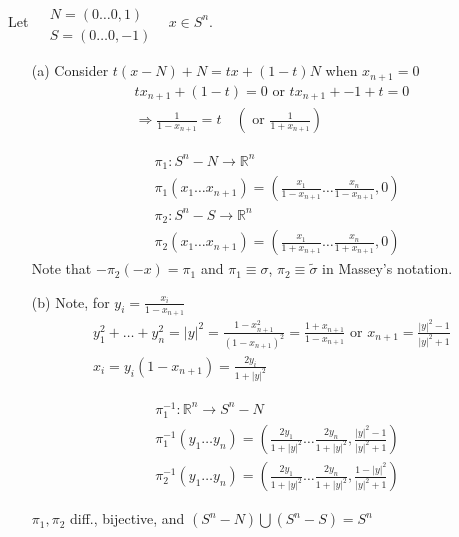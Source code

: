 Let $\begin{aligned} & \quad \\
  & N = (0 \dots 0, 1) \\ 
  & S = (0 \dots 0, -1) \end{aligned}$ \quad \, $x\in S^n$. 
\begin{enumerate}
\item[(a)]
 Consider $t(x-N) + N = tx + (1-t)N$ when $x_{n+1} =0$ 
\[
\begin{gathered}
  tx_{n+1} + (1-t) = 0 \text{ or } tx_{n+1} + -1 + t = 0 \\ 
  \Longrightarrow \frac{ 1}{ 1- x_{n+1} } = t \quad \left( \text{ or } \frac{1}{ 1 + x_{n+1} } \right)
\end{gathered}
\]

\[
\begin{aligned}
  & \pi_1: S^n - N \to \mathbb{R}^n \\ 
  & \pi_1(x_1 \dots x_{n+1}) = \left( \frac{x_1}{ 1 - x_{n+1} } \dots \frac{x_n}{ 1 - x_{n+1} } , 0 \right) \\ 
  & \pi_2 : S^n -S \to \mathbb{R}^n \\ 
  & \pi_2(x_1 \dots x_{n+1}) = \left( \frac{x_1}{ 1 + x_{n+1}} \dots \frac{x_n}{ 1 + x_{n+1} }, 0 \right)
\end{aligned}
\]
Note that $-\pi_2(-x) = \pi_1$ and $\pi_1 \equiv \sigma$, $\pi_2 \equiv \widetilde{\sigma}$ in Massey's notation.  
\item[(b)] Note, for $y_i = \frac{x_i}{ 1 - x_{n+1}}$
\[
\begin{gathered}
  y_1^2 + \dots +y_n^2 = |y|^2 = \frac{1-  x_{n+1}^2}{ (1-x_{n+1})^2 } = \frac{1+ x_{n+1}}{ 1- x_{n+1}} \text{ or } x_{n+1}  = \frac{ |y|^2 - 1 }{ |y|^2 + 1 }  \\
  x_i = y _i (1- x_{n+1}) = \frac{2y_i}{ 1 + |y|^2 }
\end{gathered}
\]

\[
\begin{aligned}
  & \pi_1^{-1}: \mathbb{R}^n \to S^n - N \\ 
  & \pi_1^{-1}(y_1 \dots y_n) = \left( \frac{2y_1}{ 1 + |y|^2 } \dots \frac{2y_n}{1+ |y|^2 } , \frac{ |y|^2 - 1 }{ |y|^2 + 1 } \right) \\ 
  & \pi_2^{-1}(y_1 \dots y_n) = \left( \frac{2y_1}{ 1 + |y|^2 } \dots \frac{2y_n}{1+ |y|^2 } , \frac{ 1 - |y|^2  }{ |y|^2 + 1 } \right)
\end{aligned}
\]

$\pi_1,\pi_2$ diff., bijective, and $(S^n - N ) \bigcup (S^n-S) = S^n$ \\


\end{enumerate}
